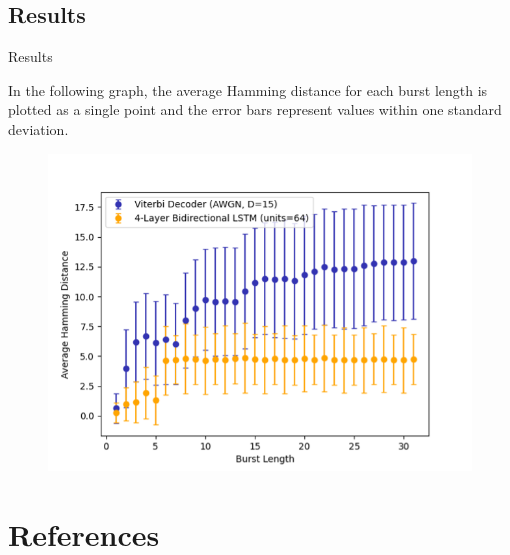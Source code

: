 \documentclass{beamer}
\newcommand{\<}				{\langle}
\renewcommand{\>}      		{\rangle}
\begin{document}
\subsection{Results} 

\begin{frame}{Results}

In the following graph, the average Hamming distance for each burst length is plotted as a single point and the error bars represent values within one standard deviation. 

\begin{figure}[h]
\includegraphics[scale=0.5]{results_graph.png}
\end{figure}

%
%


\end{frame}

\section{References}
\end{document}

